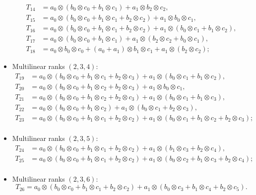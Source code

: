 \begin{itemize}
\begin{align*}
T_{14} &= a_0 \otimes (b_0 \otimes c_0 +  b_1 \otimes c_1) + a_1 \otimes b_2 \otimes c_2,\\
T_{15} &= a_0 \otimes (b_0 \otimes c_0 +  b_1 \otimes c_1 + b_2 \otimes c_2) + a_1 \otimes b_0 \otimes c_1,\\
T_{16} &= a_0 \otimes (b_0 \otimes c_0 +  b_1 \otimes c_1 + b_2 \otimes c_2) + a_1 \otimes (b_0 \otimes c_1 + b_1 \otimes c_2),\\
T_{17} &= a_0 \otimes (b_0 \otimes c_0 +  b_1 \otimes c_1) + a_1 \otimes (b_2 \otimes c_2 + b_0 \otimes c_1 ),\\
T_{18} &= a_0 \otimes b_0 \otimes c_0 +  (a_0+a_1) \otimes b_1 \otimes c_1 + a_1 \otimes (b_2 \otimes c_2);
\end{align*}
\item Multilinear ranks $(2,3,4)$:
\begin{align*}
T_{19} &= a_0 \otimes (b_0 \otimes c_0 + b_1 \otimes c_1 + b_2 \otimes c_3) + a_1 \otimes (b_0 \otimes c_1 + b_1 \otimes c_2), \\
T_{20} &= a_0 \otimes (b_0 \otimes c_0 +  b_1 \otimes c_2 + b_2 \otimes c_3) + a_1 \otimes b_0 \otimes c_1,\\
T_{21} &= a_0 \otimes (b_0 \otimes c_0 +  b_1 \otimes c_2 + b_2 \otimes c_3) + a_1 \otimes (b_0 \otimes c_1 +b_1 \otimes c_3),\\
T_{22} &= a_0 \otimes (b_0 \otimes c_0 +  b_1 \otimes c_2) + a_1 \otimes (b_0 \otimes c_1 +b_2 \otimes c_3),\\
T_{23} &= a_0 \otimes (b_0 \otimes c_0 +  b_1 \otimes c_1 + b_2 \otimes c_2) + a_1 \otimes (b_0 \otimes c_1 + b_1 \otimes c_2 + b_2 \otimes c_3);\\
\end{align*}
\item Multilinear ranks $(2,3,5)$:
\begin{align*}
T_{24} &= a_0 \otimes (b_0 \otimes c_0 + b_1 \otimes c_1 + b_2 \otimes c_2) + a_1 \otimes (b_1 \otimes c_3 + b_2 \otimes c_4), \\
T_{25} &= a_0 \otimes (b_0 \otimes c_0 +  b_1 \otimes c_1 + b_2 \otimes c_2) + a_1 \otimes (b_0 \otimes c_2 + b_1 \otimes c_3 + b_2 \otimes c_4);\\
\end{align*}
\item Multilinear ranks $(2,3,6)$:
\[
T_{26} = a_0 \otimes (b_0 \otimes c_0 +  b_1 \otimes c_1 + b_2 \otimes c_2) + a_1 \otimes (b_0 \otimes c_3 + b_1 \otimes c_4 + b_2 \otimes c_5).
\]
\end{itemize}

